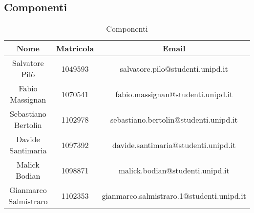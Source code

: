 	\subsection{Componenti}
	\begin{table}[H]
		\centering
		\begin{tabular}{|c|c|c|}
			\hline
			\textbf{Nome}		& \textbf{Matricola}	& \textbf{Email} \\
			\hline
			Salvatore Pilò			& 1049593 			& salvatore.pilo@studenti.unipd.it \\
			Fabio Massignan			& 1070541			& fabio.massignan@studenti.unipd.it\\
			Sebastiano Bertolin		& 1102978			& sebastiano.bertolin@studenti.unipd.it \\
			Davide Santimaria		& 1097392			& davide.santimaria@studenti.unipd.it \\
			Malick Bodian			& 1098871			& malick.bodian@studenti.unipd.it \\
			Gianmarco Salmistraro	& 1102353			& gianmarco.salmistraro.1@studenti.unipd.it \\
			\hline
		\end{tabular}
		\caption{Componenti}
	\end{table}
